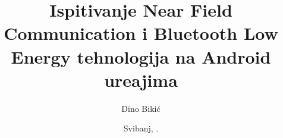 



\frontmatter   %



\title{Ispitivanje Near Field Communication i Bluetooth Low Energy tehnologija na Android ure\dj ajima}   %

\date{Svibanj, \thisyear.}   %

\author{Dino Biki\'{c}}  %

\maketitle		%





\maketitleabstract

\begin{assignmentpage}
\end{assignmentpage}

\begin{honestystatementpage}
\end{honestystatementpage}

\tableofcontents




